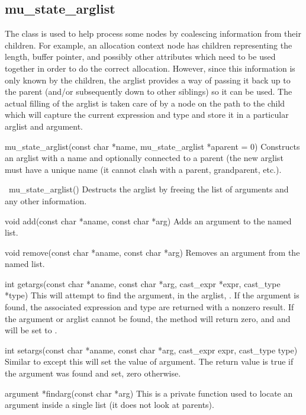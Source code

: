 \subsection{mu\_state\_arglist}
\label{subsec:BE:mustatearglist}

The  class is used to help process some \PRESC{} nodes
by coalescing information from their children.  For example, an allocation
context node has children representing the length, buffer pointer, and possibly
other attributes which need to be used together in order to do the correct
allocation.  However, since this information is only known by the children, the
arglist provides a way of passing it back up to the parent (and/or subsequently
down to other siblings) so it can be used.  The actual filling of the arglist
is taken care of by a  node on the path to
the child which will capture the current \CAST{} expression and type and store
it in a particular arglist and argument.

\begin{cprototypelist}
  \item[mu_state_arglist(const char *name, mu_state_arglist *aparent = 0)]
  Constructs an arglist with a name and optionally connected to a parent (the
  new arglist must have a unique name (it cannot clash with a parent,
  grandparent, etc.).

  \item[~mu_state_arglist()] Destructs the arglist by freeing the list of
  arguments and any other information.

  \item[void add(const char *aname, const char *arg)] Adds an argument to the
  named list.

  \item[void remove(const char *aname, const char *arg)] Removes an argument
  from the named list.

  \item[int getargs(const char *aname, const char *arg, cast_expr *expr,
  cast_type *type)] This will attempt to find the argument, 
  in the arglist, .  If the argument is found, the
  associated \CAST{} expression and type are returned with a nonzero result.
  If the argument or arglist cannot be found, the method will return zero, and
   and  will be set to .

  \item[int setargs(const char *aname, const char *arg, cast_expr expr,
  cast_type type)] Similar to  except this will set the
  value of argument.  The return value is true if the argument was found and
  set, zero otherwise.

  \item[argument *findarg(const char *arg)] This is a private function used to
  locate an argument inside a single list (it does not look at parents).
\end{cprototypelist}

